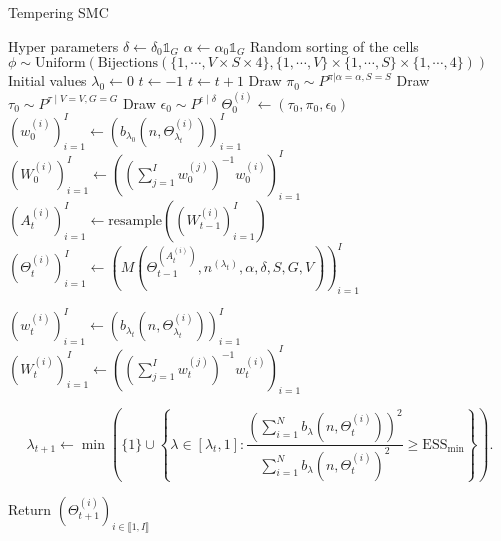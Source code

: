 \documentclass{article}
\begin{document}
\begin{algorithm}[H]
\caption{Tempering SMC}
\begin{algorithmic}

\State Hyper parameters
\Indent
\State $\delta\gets \delta_0 \mathds{1}_G$
\State $\alpha\gets \alpha_0\mathds{1}_G$ 
\EndIndent
\State Random sorting of the cells
\Indent 
\State $\phi\sim \mathrm{Uniform}\left(\mathrm{Bijections}(\{1,\cdots,V\times S\times 4\},\{1,\cdots,V\}\times\{1,\cdots,S\}\times\{1,\cdots,4\})\right)$
\EndIndent
\State Initial values
\Indent
\State $\lambda_{0}\gets 0$
\State $t\gets -1$
\EndIndent
\EndStep
{}
\State $t\gets t+1$
\State Draw $\pi_0\sim P^{\pi|\alpha=\alpha,S=S}$ 
\State Draw $\tau_0\sim P^{\tau\mid V=V,G=G}$
\State Draw $\epsilon_0\sim P^{\epsilon\mid \delta}$ 
\State $\Theta_0^{(i)}\gets(\tau_0,\pi_0,\epsilon_0)$
\State $\left(w_{0}^{(i)}\right)_{i=1}^I\gets\left(b_{\lambda_0}\left(n,\Theta_{\lambda_t}^{(i)}\right)\right)_{i=1}^I$
\State $\left(W_0^{(i)}\right)_{i=1}^I\gets\left(\left(\sum_{j=1}^I w_0^{(j)}\right)^{-1}{w_0^{(i)}}\right)_{i=1}^I$
\EndFor
\Else
        \State $\left(A_{t}^{(i)}\right)_{i=1}^I\gets \mathrm{resample}\left(\left(W_{t-1}^{(i)}\right)_{i=1}^I\right)$
         \State
         $\left(\Theta_{t}^{(i)}\right)_{i=1}^I\gets \left(M\left(\Theta_{t-1}^{(A_{t}^{(i)})},n^{(\lambda_t)},\alpha,\delta,S,G,V\right)\right)_{i=1}^I$
        
\EndIf

\State 
 
\State $\left(w_t^{(i)}\right)_{i=1}^I\gets\left(b_{\lambda_t}\left(n,\Theta_{\lambda_t}^{(i)}\right)\right)_{i=1}^I$
\State $\left(W_t^{(i)}\right)_{i=1}^I\gets\left(\left(\sum_{j=1}^I w_t^{(j)}\right)^{-1}{w_t^{(i)}}\right)_{i=1}^I$


\State 
$$\lambda_{t+1}\gets\min\left(\{1\}\cup \left\{\lambda\in [\lambda_t,1]:\frac{\left(\sum_{i=1}^N b_{\lambda}\left(n,\Theta_t^{(i)}\right)\right)^2}{\sum_{i=1}^N b_{\lambda}\left(n,\Theta_t^{(i)}\right)^2}
 \geq\mathrm{ESS}_{\mathrm{min}}\right\}\right).$$



\EndWhile
\EndStep
\State Return $\left(\Theta_{t+1}^{(i)}\right)_{i\in\llbracket 1,I\rrbracket}$
\EndProcedure
\end{algorithmic}
\end{algorithm}
\end{document}
